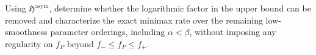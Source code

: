 Using \(\mathfrak{H}^{\mathrm{asym}}\), determine whether the logarithmic factor in the upper bound can be removed and characterize the exact minimax rate over the remaining low-smoothness parameter orderings, including \(\alpha<\beta\), without imposing any regularity on \(f_P\) beyond \(f_{-}\le f_P\le f_{+}\).